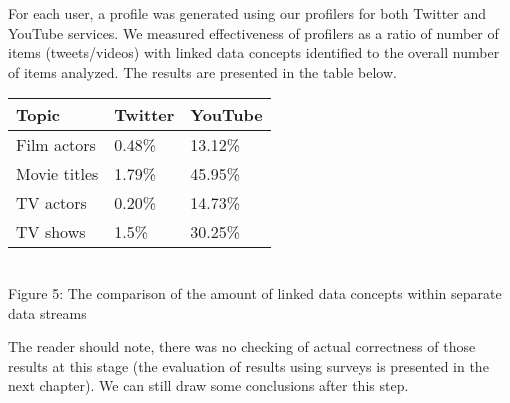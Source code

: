 For each user, a profile was generated using our profilers for both Twitter and
YouTube services. We measured effectiveness of profilers as a ratio of number of
items (tweets/videos) with linked data concepts identified to the overall number
of items analyzed. The results are presented in the table below.

\begin{center}
  \begin{tabular}{| l | l | l |}
  Topic & Twitter & YouTube \\ \hline
  Film actors & 0.48\% & 13.12\% \\
  Movie titles & 1.79\% & 45.95\% \\
  TV actors & 0.20\% & 14.73\% \\
  TV shows & 1.5\% & 30.25\% \\
  \end{tabular} \\
  Figure 5: The comparison of the amount of linked data concepts within separate data streams \\
\end{center}

The reader should note, there was no checking of actual correctness of those results at
this stage (the evaluation of results using surveys is presented in the next chapter). We
can still draw some conclusions after this step.
